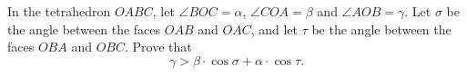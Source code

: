 \documentclass{article}
\begin{document}
\setlength{\parindent}{0pt}
In the tetrahedron $OABC$, let $\angle BOC=\alpha$, $\angle COA=\beta$ and $\angle AOB=\gamma$. Let $\sigma$ be the angle between the faces $OAB$ and $OAC$, and let $\tau$ be the angle between the faces $OBA$ and $OBC$. Prove that$$\gamma>\beta\cdot\cos\sigma+\alpha\cdot\cos\tau.$$
\end{document}
